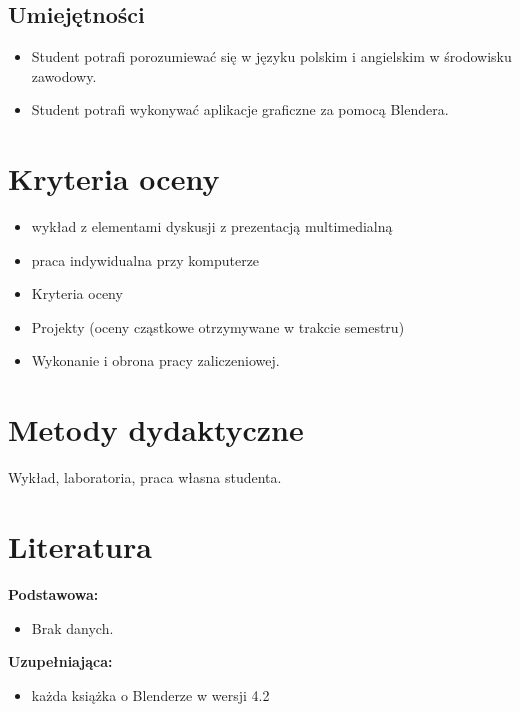 \documentclass[12pt, a4paper]{article}
\begin{document}
\subsection*{Umiejętności}
\begin{itemize}
  \item Student potrafi  porozumiewać się w języku polskim i angielskim  w środowisku zawodowy.
  \item Student potrafi  wykonywać aplikacje graficzne za pomocą Blendera.
\end{itemize}

\section{Kryteria oceny}

\begin{itemize}
  \item wykład z elementami dyskusji z prezentacją multimedialną
  \item praca indywidualna przy komputerze
  \item Kryteria oceny
  \item Projekty (oceny cząstkowe otrzymywane w trakcie semestru)
  \item Wykonanie i obrona pracy zaliczeniowej.
\end{itemize}

\section{Metody dydaktyczne}

Wykład, laboratoria, praca własna studenta.

\section{Literatura}

\textbf{Podstawowa:}
\begin{itemize}
  \item Brak danych.
\end{itemize}

\textbf{Uzupełniająca:}
\begin{itemize}
  \item każda książka o Blenderze w wersji 4.2
\end{itemize}
\end{document}
